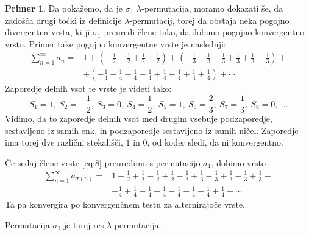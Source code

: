 \documentclass[12pt,a4paper,reqno]{amsart}
\theoremstyle{definition} %
\newtheorem{primer}[definicija]{Primer}
\theoremstyle{plain} %
\begin{document}
\begin{primer}
Da pokažemo, da je $\sigma_1$ $\lambda$-permutacija, moramo dokazati še, da zadošča drugi točki iz definicije $\lambda$-permutacij, torej da obstaja neka pogojno divergentna vrsta, ki ji $\sigma_1$ preuredi člene tako, da dobimo pogojno konvergentno vrsto. Primer take pogojno konvergentne vrste je naslednji:
\begin{align}\label{eq:8}
\sum_{n=1}^{\infty}a_n = & 1+\left(-\frac{1}{2}-\frac{1}{2}+\frac{1}{2}+\frac{1}{2}\right)+\left(-\frac{1}{3}-\frac{1}{3}-\frac{1}{3}+\frac{1}{3}+\frac{1}{3}+\frac{1}{3}\right)+ \nonumber \\ 
&+\left(-\frac{1}{4}-\frac{1}{4}-\frac{1}{4}-\frac{1}{4}+\frac{1}{4}+\frac{1}{4}+\frac{1}{4}+\frac{1}{4}\right)+\cdots
\end{align}
Zaporedje delnih vsot te vrste je videti tako: $$S_1=1,\ S_2=-\frac{1}{2}, \ S_3=0, \ S_4=\frac{1}{2}, \ S_5=1, \ S_6=\frac{2}{3}, \ S_7=\frac{1}{3}, \ S_8=0, \ \ldots$$
Vidimo, da to zaporedje delnih vsot med drugim vsebuje podzaporedje, sestavljeno iz samih enk, in podzaporedje sestavljeno iz samih ničel. Zaporedje ima torej dve različni stekališči, $1$ in $0$, od koder sledi, da ni konvergentno.

Če sedaj člene vrste \eqref{eq:8} preuredimo s permutacijo $\sigma_1$, dobimo vrsto 
\begin{align}\label{eq:9}
\sum_{n=1}^{\infty}a_{\sigma(n)} = & 1-\frac{1}{2}+\frac{1}{2}-\frac{1}{2}+\frac{1}{2}-\frac{1}{3}+\frac{1}{3}-\frac{1}{3}+\frac{1}{3}-\frac{1}{3}+\frac{1}{3}- \nonumber \\ 
&-\frac{1}{4}+\frac{1}{4}-\frac{1}{4}+\frac{1}{4}-\frac{1}{4}+\frac{1}{4}-\frac{1}{4}+\frac{1}{4}\pm\cdots
\end{align}
Ta pa konvergira po konvergenčnem testu za alternirajoče vrste. %

Permutacija $\sigma_1$ je torej res $\lambda$-permutacija.
\end{primer}
\end{document}
